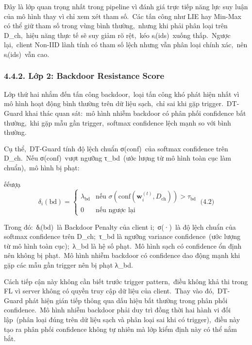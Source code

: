 Đây là lớp quan trọng nhất trong pipeline vì đánh giá trực tiếp năng lực suy luận của mô hình thay vì chỉ xem xét tham số.~Các tấn công như LIE hay Min-Max có thể giữ tham số trong vùng bình thường,~nhưng khi phải phân loại trên D\_ch,~hiệu năng thực tế sẽ suy giảm rõ rệt,~kéo sᵢ(ids)~xuống thấp.~Ngược lại,~client Non-IID lành tính có tham số lệch nhưng vẫn phân loại chính xác,~nên sᵢ(ids)~vẫn cao.

\subsubsection{4.4.2. Lớp 2: Backdoor Resistance Score}\label{lux1edbp-2-backdoor-resistance-score}

Lớp thứ hai nhắm đến tấn công backdoor,~loại tấn công khó phát hiện nhất vì mô hình hoạt động bình thường trên dữ liệu sạch,~chỉ sai khi gặp trigger.~DT-Guard khai thác quan sát:~mô hình nhiễm backdoor có phân phối confidence bất thường,~khi gặp mẫu gần trigger,~softmax confidence lệch mạnh so với bình thường.

Cụ thể,~DT-Guard tính độ lệch chuẩn σ(conf)~của softmax confidence trên D\_ch.~Nếu σ(conf)~vượt ngưỡng τ\_bd~(ước lượng từ mô hình toàn cục làm chuẩn),~mô hình bị phạt:

ếếượạ\\
\[\delta_{i}(\text{bd}) = \left\{ \begin{matrix}
\lambda_{\text{bd}} & \text{nếu~}\sigma(\text{conf}(\mathbf{w}_{i}^{(t)},D_{\text{ch}})) > \tau_{\text{bd}} \\
0 & \text{nếu ngược lại}
\end{matrix} \right.\ \text{(4.2)}
\]

Trong đó:~δᵢ(bd)~là Backdoor Penalty của client i;~σ(·)~là độ lệch chuẩn của softmax confidence trên D\_ch;~τ\_bd là ngưỡng variance confidence~(ước lượng từ mô hình toàn cục);~λ\_bd là hệ số phạt.~Mô hình sạch có confidence ổn định nên không bị phạt.~Mô hình nhiễm backdoor có confidence dao động mạnh khi gặp các mẫu gần trigger nên bị phạt λ\_bd.

Cách tiếp cận này không cần biết trước trigger pattern,~điều không khả thi trong FL vì server không có quyền truy cập dữ liệu của client.~Thay vào đó,~DT-Guard phát hiện gián tiếp thông qua dấu hiệu bất thường trong phân phối confidence.~Mô hình nhiễm backdoor phải duy trì đồng thời hai hành vi đối lập~(phân loại đúng trên dữ liệu sạch và phân loại sai khi có trigger),~điều này tạo ra phân phối confidence không tự nhiên mà lớp kiểm định này có thể nắm bắt.

